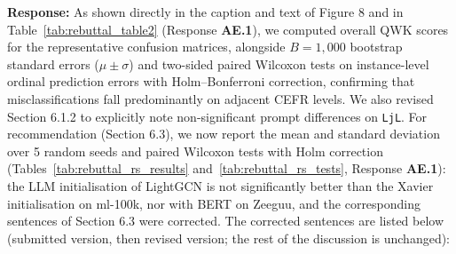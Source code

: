 \documentclass[11pt,a4paper]{article}
\newcommand{\mm}[1]{#1}
\begin{document}
\noindent\textbf{Response:}
As shown directly in the caption and text of Figure 8 and in Table~\ref{tab:rebuttal_table2} (Response \textbf{AE.1}), we computed overall QWK scores for the representative confusion matrices, alongside $B = 1{,}000$ bootstrap standard errors ($\mu \pm \sigma$) and two-sided paired Wilcoxon tests on instance-level ordinal prediction errors with Holm--Bonferroni correction, confirming that misclassifications fall predominantly on adjacent CEFR levels. We also revised Section 6.1.2 to explicitly note non-significant prompt differences on \texttt{LjL}. \mm{For recommendation (Section 6.3), we now report the mean and standard deviation over 5 random seeds and paired Wilcoxon tests with Holm correction (Tables~\ref{tab:rebuttal_rs_results} and~\ref{tab:rebuttal_rs_tests}, Response \textbf{AE.1}): the LLM initialisation of LightGCN is not significantly better than the Xavier initialisation on ml-100k, nor with BERT on Zeeguu, and the corresponding sentences of Section 6.3 were corrected.} \mm{The corrected sentences are listed below (submitted version, then revised version; the rest of the discussion is unchanged):}
\end{document}
